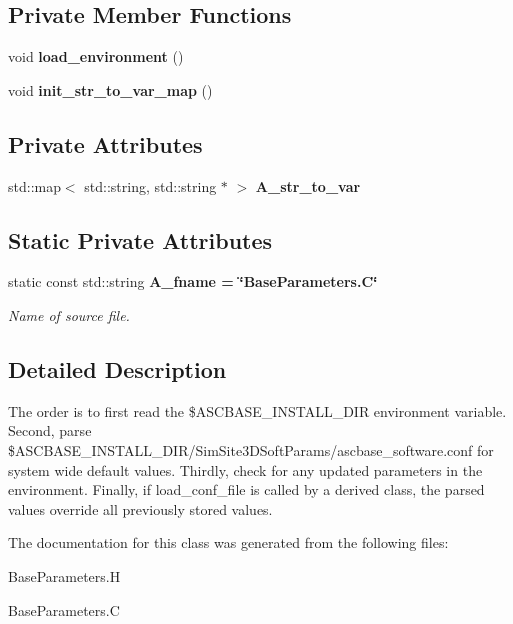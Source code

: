 \subsection*{Private Member Functions}
\begin{CompactItemize}
\item 
void \textbf{load\_\-environment} ()\label{classSimSite3D_1_1BaseParameters_d14f824ff3778e6eeadc6f280e712fa8}

\item 
void \textbf{init\_\-str\_\-to\_\-var\_\-map} ()\label{classSimSite3D_1_1BaseParameters_2b6efe90e6fc04c12a708793b134c337}

\end{CompactItemize}
\subsection*{Private Attributes}
\begin{CompactItemize}
\item 
std::map$<$ std::string, std::string $\ast$ $>$ \textbf{A\_\-str\_\-to\_\-var}\label{classSimSite3D_1_1BaseParameters_d2d6dce8fdb7bc506d95de45aa545b07}

\end{CompactItemize}
\subsection*{Static Private Attributes}
\begin{CompactItemize}
\item 
static const std::string \bf{A\_\-fname} = \char`\"{}Base\-Parameters.C\char`\"{}\label{classSimSite3D_1_1BaseParameters_41d22522d6af1b42c1ae142bba6190ca}

\begin{CompactList}\small\item\em Name of source file. \item\end{CompactList}\end{CompactItemize}


\subsection{Detailed Description}
The order is to first read the \$ASCBASE\_\-INSTALL\_\-DIR environment variable. Second, parse \$ASCBASE\_\-INSTALL\_\-DIR/SimSite3D\-Soft\-Params/ascbase\_\-software.conf for system wide default values. Thirdly, check for any updated parameters in the environment. Finally, if load\_\-conf\_\-file is called by a derived class, the parsed values override all previously stored values. 



The documentation for this class was generated from the following files:\begin{CompactItemize}
\item 
Base\-Parameters.H\item 
Base\-Parameters.C\end{CompactItemize}

